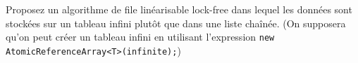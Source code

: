 
\begingroup

\begin{exercice}
  \begin{questions}
  \item Proposez un algorithme de file linéarisable lock-free dans lequel les données sont stockées sur un tableau infini plutôt que dans une liste chaînée.
    (On supposera qu'on peut créer un tableau infini en utilisant l'expression \lstinline{new AtomicReferenceArray<T>(infinite);})
  \end{questions}
\end{exercice}

\endgroup
\endinput
